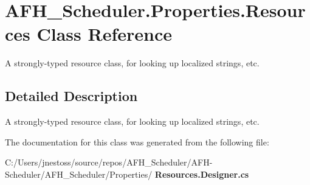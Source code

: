 \section{A\+F\+H\+\_\+\+Scheduler.\+Properties.\+Resources Class Reference}
\label{class_a_f_h___scheduler_1_1_properties_1_1_resources}


A strongly-\/typed resource class, for looking up localized strings, etc.  




\subsection{Detailed Description}
A strongly-\/typed resource class, for looking up localized strings, etc. 



The documentation for this class was generated from the following file\+:\begin{DoxyCompactItemize}
\item 
C\+:/\+Users/jnestoss/source/repos/\+A\+F\+H\+\_\+\+Scheduler/\+A\+F\+H-\/\+Scheduler/\+A\+F\+H\+\_\+\+Scheduler/\+Properties/\textbf{ Resources.\+Designer.\+cs}\end{DoxyCompactItemize}
